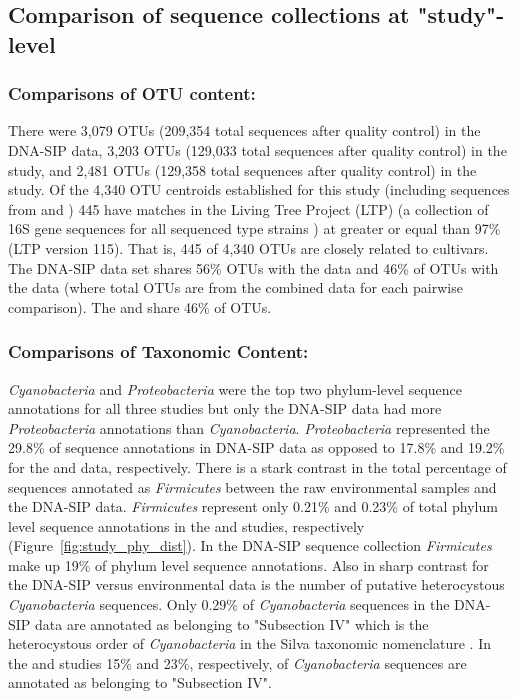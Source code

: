 \subsection{Comparison of sequence collections at "study"-level}
\subsubsection{Comparisons of OTU content:} There were 3,079 OTUs (209,354
total sequences after quality control) in the DNA-SIP data, 3,203 OTUs (129,033
total sequences after quality control) in the \citet{Garcia_Pichel_2013} study,
and 2,481 OTUs (129,358 total sequences after quality control) in the
\citet{Steven_2013} study. Of the 4,340 OTU centroids established for this
study (including sequences from \citet{Steven_2013} and
\citet{Garcia_Pichel_2013}) 445 have matches in the Living Tree Project (LTP)
(a collection of 16S gene sequences for all sequenced type strains
\citep{Yarza_2008}) at greater or equal than 97\% (LTP version 115). That is,
445 of 4,340 OTUs are closely related to cultivars. The DNA-SIP data set shares 56\%
OTUs with the \citet{Steven_2013} data and 46\% of OTUs with the
\citet{Garcia_Pichel_2013} data (where total OTUs are from the combined data
for each pairwise comparison).  The \citet{Steven_2013} and
\citet{Garcia_Pichel_2013} share 46\% of OTUs.

\subsubsection{Comparisons of Taxonomic Content:} \textit{Cyanobacteria} and
\textit{Proteobacteria} were the top two phylum-level sequence annotations
for all three studies but only the DNA-SIP data had more
\textit{Proteobacteria} annotations than \textit{Cyanobacteria}.
\textit{Proteobacteria} represented the 29.8\% of sequence annotations in
DNA-SIP data as opposed to 17.8\% and 19.2\% for the \citet{Garcia_Pichel_2013}
and \citet{Steven_2013} data, respectively.  There is a stark contrast in the
total percentage of sequences annotated as \textit{Firmicutes} between the raw
environmental samples and the DNA-SIP data. \textit{Firmicutes} represent only
0.21\% and 0.23\% of total phylum level sequence annotations in the
\citet{Steven_2013} and \citet{Garcia_Pichel_2013} studies, respectively
(Figure~\ref{fig:study_phy_dist}). In the DNA-SIP sequence collection
\textit{Firmicutes} make up 19\% of phylum level sequence annotations. Also in
sharp contrast for the DNA-SIP versus environmental data is the number of
putative heterocystous \textit{Cyanobacteria} sequences. Only 0.29\% of
\textit{Cyanobacteria} sequences in the DNA-SIP data are annotated as belonging
to "Subsection IV" which is the heterocystous order of \textit{Cyanobacteria}
in the Silva taxonomic nomenclature \citep{17947321}. In the
\citet{Steven_2013} and \citet{Garcia_Pichel_2013} studies 15\% and 23\%,
respectively, of \textit{Cyanobacteria} sequences are annotated as belonging to
"Subsection
IV".  


